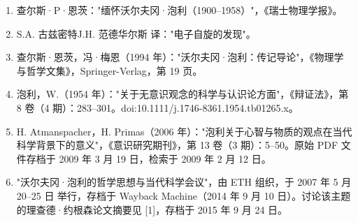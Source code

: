 \begin{enumerate}
\item 查尔斯·P·恩茨："缅怀沃尔夫冈·泡利（1900–1958）"，《瑞士物理学报》。  
\item S.A. 古兹密特J.H. 范德华尔斯 译："电子自旋的发现"。  
\item 查尔斯·恩茨，冯·梅恩（1994 年）："沃尔夫冈·泡利：传记导论"，《物理学与哲学文集》，Springer-Verlag，第 19 页。  
\item 泡利，W.（1954 年）："关于无意识观念的科学与认识论方面"，《辩证法》，第 8 卷（4 期）：283–301。doi:10.1111/j.1746-8361.1954.tb01265.x。  
\item H. Atmanspacher，H. Primas（2006 年）："泡利关于心智与物质的观点在当代科学背景下的意义"，《意识研究期刊》，第 13 卷（3 期）：5–50。原始 PDF 文件存档于 2009 年 3 月 19 日，检索于 2009 年 2 月 12 日。  
\item "沃尔夫冈·泡利的哲学思想与当代科学会议"，由 ETH 组织，于 2007 年 5 月 20–25 日 举行，存档于 Wayback Machine（2014 年 9 月 10 日）。讨论该主题的理查德·约根森论文摘要见 [1]，存档于 2015 年 9 月 24 日。
\end{enumerate}